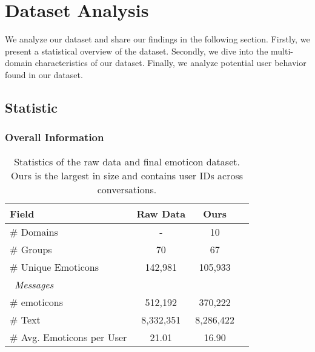 \section{Dataset Analysis}
We analyze our dataset and share our findings in the following section. Firstly, we present a statistical overview of the dataset. Secondly, we dive into the multi-domain characteristics of our dataset. Finally, we analyze potential user behavior found in our dataset.

\subsection{Statistic}

\subsubsection{Overall Information}

\begin{table}[h]
    \centering
    \caption{Statistics of the raw data and final emoticon dataset. Ours is the largest in size and contains user IDs across conversations.}
    \begin{tabular}{@{}lccc@{}} 
    \toprule
    Field & Raw Data & Ours \\ \hline
    \# Domains                               & -       & 10     \\
    \# Groups                                   & 70      & 67 \\
    \# Unique Emoticons                          & 142,981 & 105,933 \\
    \midrule
    \ \textit{Messages} &&& \\
    \# emoticons                      & 512,192   & 370,222 \\
    \# Text                          & 8,332,351 & 8,286,422 \\
    \midrule
    \# Avg. Emoticons per User        & 21.01    & 16.90 \\
    \bottomrule     
    \end{tabular}
    \label{tab:dataset-statistics}
\end{table}

